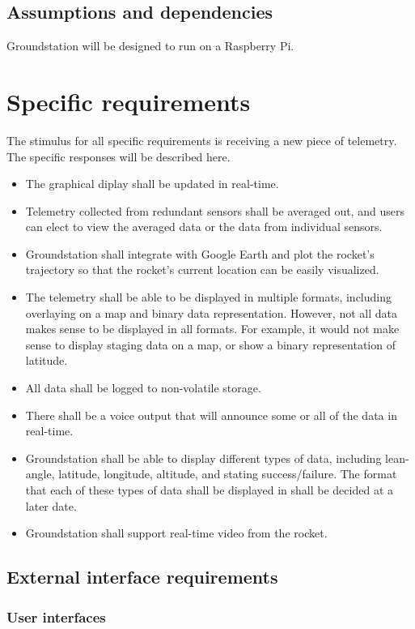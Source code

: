 \documentclass[10pt,journal,draftclsnofoot,onecolumn]{IEEEtran}
\begin{document}
	\subsection{Assumptions and dependencies}
	Groundstation will be designed to run on a Raspberry Pi.
	
	\section{Specific requirements}
	
	The stimulus for all specific requirements is receiving a new piece of telemetry. The specific responses will be described here.
		
	\begin{itemize}
		\item The graphical diplay shall be updated in real-time.
		\item Telemetry collected from redundant sensors shall be averaged out, and users can elect to view the averaged data or the data from individual sensors.
		\item Groundstation shall integrate with Google Earth and plot the rocket's trajectory so that the rocket's current location can be easily visualized.
		\item The telemetry shall be able to be displayed in multiple formats, including overlaying on a map and binary data representation.
		However, not all data makes sense to be displayed in all formats.
		For example, it would not make sense to display staging data on a map, or show a binary representation of latitude.
		\item All data shall be logged to non-volatile storage.
		\item There shall be a voice output that will announce some or all of the data in real-time.
		\item Groundstation shall be able to display different types of data, including lean-angle, latitude, longitude, altitude, and stating success/failure. The format that each of these types of data shall be displayed in shall be decided at a later date.
		\item Groundstation shall support real-time video from the rocket.
	\end{itemize}
	
	\subsection{External interface requirements}
	\subsubsection{User interfaces}
\end{document}
